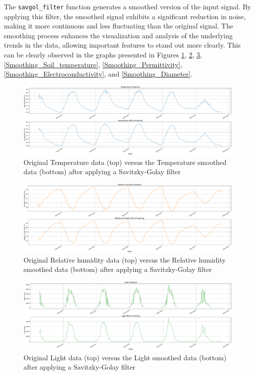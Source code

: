 The \texttt{savgol\_filter} function generates a smoothed version of the input signal. By applying this filter, the smoothed signal exhibits a significant reduction in noise, making it more continuous and less fluctuating than the original signal. The smoothing process enhances the visualization and analysis of the underlying trends in the data, allowing important features to stand out more clearly. This can be clearly observed in the graphs presented in Figures \ref{Smoothing_Temperature}, \ref{Smoothing_Relative_humidity}, \ref{Smoothing_Light}, \ref{Smoothing_Soil_temperature}, \ref{Smoothing_Permittivity}, \ref{Smoothing_Electroconductivity}, and \ref{Smoothing_Diameter}.

\begin{figure}[htbp]
    \centering
    \includegraphics[width=15 cm]{5_ChapterDesign/figuras/2_Smoothing/Smoothing_Temperature}
    \caption{Original Temperature data (top) versus the Temperature smoothed data (bottom) after applying a Savitzky-Golay filter}
    \label{Smoothing_Temperature}
\end{figure}

\begin{figure}[htbp]
    \centering
    \includegraphics[width=15 cm]{5_ChapterDesign/figuras/2_Smoothing/Smoothing_Relative_humidity}
    \caption{Original Relative humidity data (top) versus the Relative humidity smoothed data (bottom) after applying a Savitzky-Golay filter}
    \label{Smoothing_Relative_humidity}
\end{figure}

\begin{figure}[htbp]
    \centering
    \includegraphics[width=15 cm]{5_ChapterDesign/figuras/2_Smoothing/Smoothing_Light}
    \caption{Original Light data (top) versus the Light smoothed data (bottom) after applying a Savitzky-Golay filter}
    \label{Smoothing_Light}
\end{figure}


